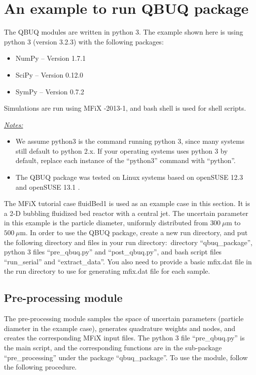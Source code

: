 \documentclass[a4paper,12pt,titlepage]{article}
\newcommand{\MFIX}{MFiX }
\begin{document}
\section{An example to run QBUQ package}
\label{sec:ExampleQBUQ}
The QBUQ modules are written in python 3. The example shown here is using
python 3 (version 3.2.3) \cite{Python} with the following packages:
\begin{itemize}
 \item NumPy -- Version 1.7.1 \cite{NumPy}
 \item SciPy -- Version 0.12.0 \cite{SciPy}
 \item SymPy -- Version 0.7.2 \cite{SymPy}
\end{itemize}
Simulations are run using \MFIX-2013-1, and bash shell is used for shell scripts.

\emph{\underline{Notes:}} 
\begin{itemize}
 \item We assume python3 is the command running python 3, since many systems still default to python 2.x. If your operating systems uses python 3 by default, replace each instance of the ``python3'' command with ``python''.
 \item The QBUQ package was tested on Linux systems based on openSUSE 12.3 and openSUSE 13.1 \cite{openSUSE}.
\end{itemize}

The \MFIX tutorial case fluidBed1 is used as an example case in this section. It
is a 2-D bubbling fluidized bed reactor with a central jet. The uncertain
parameter in this example is the particle diameter, uniformly distributed from
$300\ \mu\textrm{m}$ to $500\ \mu\textrm{m}$. In order to use the QBUQ package,
create a new run directory, and put the following directory and files in your
run directory:\ directory ``qbuq\_package'', python 3 files ``pre\_qbuq.py'' and
``post\_qbuq.py'', and bash script files ``run\_serial'' and ``extract\_data''.
You also need to provide a basic mfix.dat file in the run directory to use for
generating mfix.dat file for each sample.

\subsection{Pre-processing module}
\label{sec:Pre-processing}
The pre-processing module samples the space of uncertain parameters (particle
diameter in the example case), generates quadrature weights and nodes, and
creates the corresponding \MFIX input files. The python 3 file ``pre\_qbuq.py''
is the main script, and the corresponding functions are in the sub-package
``pre\_processing'' under the package ``qbuq\_package''. To use the module,
follow the following procedure.
\end{document}

